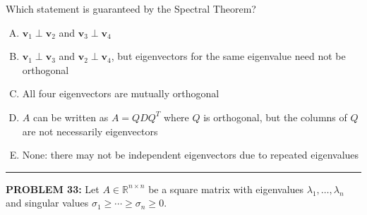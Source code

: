\documentclass[12pt]{amsart}
\newcommand{\divider}{
  \vspace{-1em} %
  \noindent
  \raisebox{-0.15ex}{\textbullet}%
  \hspace{0.5em}%
  \rule[0.5ex]{0.95\textwidth}{1.0pt}%
  \hspace{0.5em}%
  \raisebox{-0.15ex}{\textbullet}%
  \vspace{0em} %
}
\begin{document}
{Which statement is guaranteed by the Spectral Theorem?

\begin{enumerate}[(A)]
\item $\mathbf{v}_1 \perp \mathbf{v}_2$ and $\mathbf{v}_3 \perp \mathbf{v}_4$
\item $\mathbf{v}_1 \perp \mathbf{v}_3$ and $\mathbf{v}_2 \perp \mathbf{v}_4$, but eigenvectors for the same eigenvalue need not be orthogonal
\item All four eigenvectors are mutually orthogonal
\item $A$ can be written as $A = QDQ^T$ where $Q$ is orthogonal, but the columns of $Q$ are not necessarily eigenvectors
\item None: there may not be independent eigenvectors due to repeated eigenvalues
\end{enumerate}


\divider





{\bf PROBLEM 33:}
% 
Let $A \in \mathbb{R}^{n \times n}$ be a square matrix with eigenvalues $\lambda_1, \ldots, \lambda_n$ and singular values $\sigma_1 \geq \cdots \geq \sigma_n \geq 0$.

}
\end{document}
